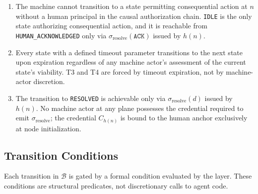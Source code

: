 \begin{enumerate}\itemsep=0pt
\item[$\textbf{(SP-1) Non-regression.}$] The machine cannot transition to a state permitting consequential action at $n$ without a human principal in the causal authorization chain. \texttt{IDLE} is the only state authorizing consequential action, and it is reachable from \texttt{HUMAN\_ACKNOWLEDGED} only via $\sigma_{\text{resolve}}(\texttt{ACK})$ issued by $h(n)$.

\item[$\textbf{(SP-2) Timeout-forced progression.}$] Every state with a defined timeout parameter transitions to the next state upon expiration regardless of any machine actor's assessment of the current state's viability. T3 and T4 are forced by timeout expiration, not by machine-actor discretion.

\item[$\textbf{(SP-3) Human-only resolution.}$] The transition to \texttt{RESOLVED} is achievable only via $\sigma_{\text{resolve}}(d)$ issued by $h(n)$. No machine actor at any plane possesses the credential required to emit $\sigma_{\text{resolve}}$; the credential $C_{h(n)}$ is bound to the human anchor exclusively at node initialization.
\end{enumerate}

\subsection{Transition Conditions}
\label{sec:bp-transitions-conditions}

Each transition in $\mathcal{B}$ is gated by a formal condition evaluated by the \fact{} layer. These conditions are structural predicates, not discretionary calls to agent code.


